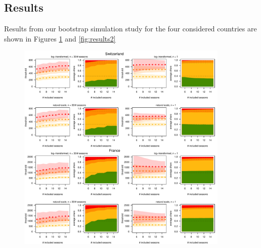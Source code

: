 \documentclass{article}
\begin{document}
\subsection{Results}

Results from our bootstrap simulation study for the four considered countries are shown in Figures \ref{fig:results1} and \ref{fig:results2}

\begin{figure}
\includegraphics[page=1, width=0.9\textwidth]{figure/plot_results.pdf}
\label{fig:results1}
\end{figure}
\end{document}
